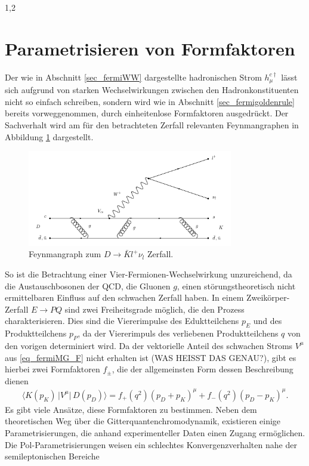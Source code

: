 \documentclass[11pt,a4paper,twoside]{report}
\begin{document}
\begin{spacing}{1,2}
\section{Parametrisieren von Formfaktoren}
\label{sec_paramForm}
Der wie in Abschnitt \ref{sec_fermiWW} dargestellte hadronischen Strom $h_\mu^{c\dagger}$ lässt sich aufgrund von starken Wechselwirkungen zwischen den 
Hadronkonstituenten nicht so einfach schreiben, sondern wird wie in Abschnitt \ref{sec_fermigoldenrule} bereits vorweggenommen, durch einheitenlose Formfaktoren 
ausgedrückt\cite{KimPham}. Der Sachverhalt wird am für den betrachteten Zerfall relevanten Feynmangraphen in Abbildung \ref{pic_Dfeyn} dargestellt.
\begin{figure}[H]
\includegraphics[width=0.8\textwidth]{Abbildungen/DFeyn.png}
\caption{Feynmangraph zum $D\rightarrow \bar K l^+ \nu_l$ Zerfall.}
\label{pic_Dfeyn}
\end{figure}
\noindent
So ist die Betrachtung einer Vier-Fermionen-Wechselwirkung unzureichend, da die Austauschbosonen der QCD, die Gluonen $g$, einen störungstheoretisch nicht
ermittelbaren Einfluss auf den schwachen Zerfall haben.
In einem Zweikörper-Zerfall $E\rightarrow PQ$ sind zwei Freiheitsgrade möglich, die den Prozess charakterisieren. Dies sind die Viererimpulse des Eduktteilchens
$p_E$ und des Produktteilchens $p_P$, da der Viererimpuls des verliebenen Produktteilchens $q$ von den vorigen determiniert wird. Da der vektorielle 
Anteil des schwachen Stroms $V^\mu$ aus \eqref{eq_fermiMG_F} nicht erhalten ist (WAS HEISST DAS GENAU?), gibt es hierbei zwei Formfaktoren $f_\pm$, die der allgemeinsten Form
dessen Beschreibung dienen
\begin{align}
 \big\langle K(p_K)\,\big|V^\mu\big|\, D(p_D)\big\rangle = f_+(q^2)(p_D+p_K)^\mu + f_-(q^2)(p_D-p_K)^\mu.
\end{align}
Es gibt viele Ansätze, diese Formfaktoren zu bestimmen. Neben dem theoretischen Weg über die Gitterquantenchromodynamik, existieren einige Parametrisierungen,
die anhand experimenteller Daten einen Zugang ermöglichen. Die Pol-Parametrisierungen weisen ein schlechtes Konvergenzverhalten nahe der semileptonischen Bereiche

\end{spacing}
\end{document}
